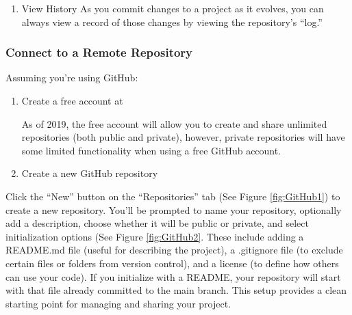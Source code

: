 \begin{enumerate}
\item View History
As you commit changes to a project as it evolves, you can always view a record of those changes by viewing the repository's ``log.''
\begin{terminal}
\end{terminal}

\end{enumerate}

\subsubsection{Connect to a Remote Repository}
Assuming you’re using GitHub:
\begin{enumerate}
\item Create a free account at 
	
	As of 2019, the free account will allow you to create and share unlimited repositories (both public and private), however, private repositories will have some limited functionality when using a free GitHub account.
	\newpage
	
\item Create a new GitHub repository
\end{enumerate}

	
	
	Click the ``New'' button on the ``Repositories'' tab (See Figure \ref{fig:GitHub1}) to create a new repository. You’ll be prompted to name your repository, optionally add a description, choose whether it will be public or private, and select initialization options (See Figure \ref{fig:GitHub2}.  These include adding a README.md file (useful for describing the project), a .gitignore file (to exclude certain files or folders from version control), and a license (to define how others can use your code). If you initialize with a README, your repository will start with that file already committed to the main branch. This setup provides a clean starting point for managing and sharing your project. 
	
